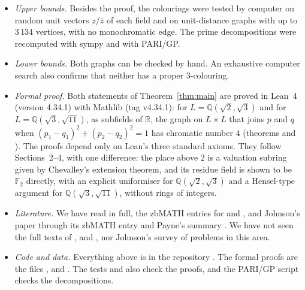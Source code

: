 \documentclass[11pt,a4paper]{amsart}
\theoremstyle{remark}
\newcommand{\F}{\mathbb{F}}
\newcommand{\Q}{\mathbb{Q}}
\newcommand{\R}{\mathbb{R}}
\begin{document}
\begin{itemize}
\item \emph{Upper bounds.} Besides the proof, the colourings were tested by computer on random unit vectors
$z/\bar z$ of each field and on unit-distance graphs with up to $3\,134$ vertices, with no monochromatic edge.
The prime decompositions were recomputed with sympy and with PARI/GP.
\item \emph{Lower bounds.} Both graphs can be checked by hand. An exhaustive computer search also confirms that
neither has a proper $3$-colouring.
\item \emph{Formal proof.} Both statements of Theorem~\ref{thm:main} are proved in Lean~4 \cite{Lean4}
(version 4.34.1) with Mathlib \cite{Mathlib} (tag v4.34.1): for $L=\Q(\sqrt2,\sqrt3)$ and for
$L=\Q(\sqrt3,\sqrt{11})$, as subfields of $\R$, the graph on $L\times L$ that joins $p$ and $q$ when
$(p_1-q_1)^2+(p_2-q_2)^2=1$ has chromatic number $4$ (theorems  and
). The proofs depend only on Lean's three standard axioms. They follow
Sections~2--4, with one difference: the place above $2$ is a valuation subring given by Chevalley's extension
theorem, and its residue field is shown to be $\F_2$ directly, with an explicit uniformiser for
$\Q(\sqrt2,\sqrt3)$ and a Hensel-type argument for $\Q(\sqrt3,\sqrt{11})$, without rings of integers.
\item \emph{Literature.} We have read \cite{Fischer1990} in full, the zbMATH entries for \cite{Fischer1990b} and
\cite{Fischer1994}, and Johnson's paper \cite{Johnson1987} through its zbMATH entry and Payne's summary
\cite{Payne}. We have not seen the full texts of \cite{Fischer1990b}, \cite{Fischer1994} and
\cite{Johnson1987}, nor Johnson's survey \cite{Johnson2000} of problems in this area.
\item \emph{Code and data.} Everything above is in the repository \cite{Repo}. The formal proofs are the
files ,  and . The tests  and
 also check the proofs, and the PARI/GP script  checks the
decompositions.
\end{itemize}
\end{document}
